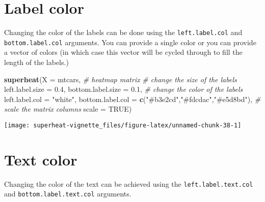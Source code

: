 \documentclass[]{book}
\newenvironment{Shaded}{\begin{snugshade}}{\end{snugshade}}
\newcommand{\KeywordTok}[1]{\textcolor[rgb]{0.13,0.29,0.53}{\textbf{{#1}}}}
\newcommand{\DataTypeTok}[1]{\textcolor[rgb]{0.13,0.29,0.53}{{#1}}}
\newcommand{\FloatTok}[1]{\textcolor[rgb]{0.00,0.00,0.81}{{#1}}}
\newcommand{\StringTok}[1]{\textcolor[rgb]{0.31,0.60,0.02}{{#1}}}
\newcommand{\CommentTok}[1]{\textcolor[rgb]{0.56,0.35,0.01}{\textit{{#1}}}}
\newcommand{\OtherTok}[1]{\textcolor[rgb]{0.56,0.35,0.01}{{#1}}}
\newcommand{\NormalTok}[1]{{#1}}
\theoremstyle{definition}
\theoremstyle{definition}
\theoremstyle{remark}
\begin{document}
\section{Label color}\label{label-color}

Changing the color of the labels can be done using the
\texttt{left.label.col} and \texttt{bottom.label.col} arguments. You can
provide a single color or you can provide a vector of colors (in which
case this vector will be cycled through to fill the length of the
labels.)

\begin{Shaded}
\begin{Highlighting}[]
\KeywordTok{superheat}\NormalTok{(}\DataTypeTok{X =} \NormalTok{mtcars, }\CommentTok{# heatmap matrix}
          \CommentTok{# change the size of the labels}
          \DataTypeTok{left.label.size =} \FloatTok{0.4}\NormalTok{,}
          \DataTypeTok{bottom.label.size =} \FloatTok{0.1}\NormalTok{,}
          \CommentTok{# change the color of the labels}
          \DataTypeTok{left.label.col =} \StringTok{"white"}\NormalTok{,}
          \DataTypeTok{bottom.label.col =} \KeywordTok{c}\NormalTok{(}\StringTok{"#b3e2cd"}\NormalTok{,}\StringTok{"#fdcdac"}\NormalTok{,}\StringTok{"#e5d8bd"}\NormalTok{),}
          \CommentTok{# scale the matrix columns}
          \DataTypeTok{scale =} \OtherTok{TRUE}\NormalTok{)}
\end{Highlighting}
\end{Shaded}

\begin{center}\texttt{[image: superheat-vignette\_files/figure-latex/unnamed-chunk-38-1]} \end{center}

\section{Text color}\label{text-color-1}

Changing the color of the text can be achieved using the
\texttt{left.label.text.col} and \texttt{bottom.label.text.col}
arguments.

\begin{Shaded}
\end{Shaded}
\end{document}
